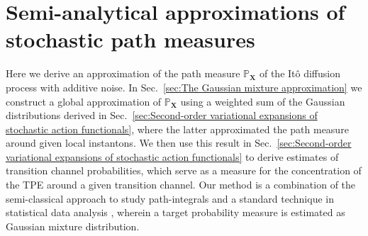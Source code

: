 \section{Semi-analytical approximations of stochastic path measures} \label{sec:Semi-analytical approximations of stochastic path measures}

Here we derive an approximation of the path measure $\mathbb{P}_\mathbf{X}$ of the It\^{o} diffusion process with additive noise. In Sec.~\ref{sec:The Gaussian mixture approximation} we construct a global approximation of $\mathbb{P}_\mathbf{X}$ using a weighted sum of the Gaussian distributions derived in Sec.~\ref{sec:Second-order variational expansions of stochastic action functionals}, where the latter approximated the path measure around given local instantons. We then use this result in Sec.~\ref{sec:Second-order variational expansions of stochastic action functionals} to derive estimates of transition channel probabilities, which serve as a measure for the concentration of the TPE around a given transition channel. Our method is a combination of the semi-classical approach to study path-integrals \citep{chaichianPathIntegralsPhysics2001, schulmanTechniquesApplicationsPath1996, smirnovEstimationPathIntegral2010, moretteDefinitionApproximationFeynman1951, marinovPathIntegralsQuantum1980, sakuraiModernQuantumMechanics2017} and a standard technique in statistical data analysis \citep{gelmanBayesianDataAnalysis, scottMultivariateDensityEstimation2015, goodfellowDeepLearning2016, nguyenApproximationFiniteMixtures2020, carreira-perpinanModefindingMixturesGaussian2000}, wherein a target probability measure is estimated as Gaussian mixture distribution. 

